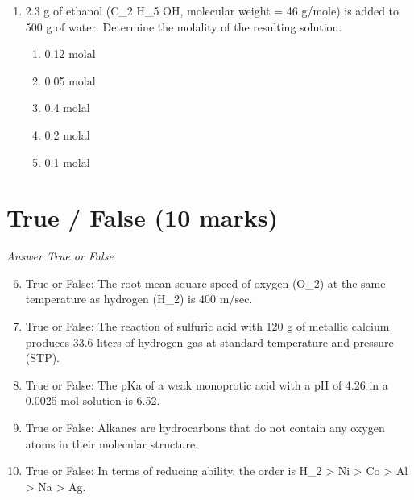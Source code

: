 \documentclass[12pt]{article}
\begin{document}
\begin{enumerate}[label=\arabic*.]
\begin{enumerate}[label=(\alph*)]
    \item 1.2$\mathrm{dm}^3 \mathrm{~mol}^{-1}$
    \item 1.35$\mathrm{dm}^3 \mathrm{~mol}^{-1}$
    \item 2.0$\mathrm{dm}^3 \mathrm{~mol}^{-1}$
    \item 0.8$\mathrm{dm}^3 \mathrm{~mol}^{-1}$
    \item 1.8$\mathrm{dm}^3 \mathrm{~mol}^{-1}$
\end{enumerate}
\item 2.3 g of ethanol (C\_2 H\_5 OH, molecular weight = 46 g/mole) is added to 500 g of water. Determine the molality of the resulting solution.
\begin{enumerate}[label=(\alph*)]
    \item 0.12 molal
    \item 0.05 molal
    \item 0.4 molal
    \item 0.2 molal
    \item 0.1 molal
\end{enumerate}
\end{enumerate}

\section*{True / False (10 marks)}
\textit{Answer True or False}
\begin{enumerate}[label=\arabic*.]
\setcounter{enumi}{5}
\item True or False: The root mean square speed of oxygen (O\_2) at the same temperature as hydrogen (H\_2) is 400 m/sec.
\item True or False: The reaction of sulfuric acid with 120 g of metallic calcium produces 33.6 liters of hydrogen gas at standard temperature and pressure (STP).
\item True or False: The pKa of a weak monoprotic acid with a pH of 4.26 in a 0.0025 mol solution is 6.52.
\item True or False: Alkanes are hydrocarbons that do not contain any oxygen atoms in their molecular structure.
\item True or False: In terms of reducing ability, the order is H\_2 \textgreater{} Ni \textgreater{} Co \textgreater{} Al \textgreater{} Na \textgreater{} Ag.
\end{enumerate}
\end{document}
